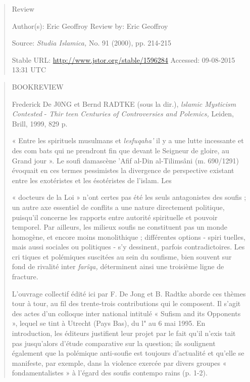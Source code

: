 \begin{quote}
Review

Author(s): Eric Geoffroy Review by: Eric Geoffroy

Source: \emph{Studia Islamica,} No. 91 (2000), pp. 214-215

Stable URL: \url{http://www.jstor.org/stable/1596284} Accessed:
09-08-2015 13:31 UTC
\end{quote}

\begin{quote}
BOOKREVIEW

Frederick De J0NG et Bernd RADTKE (sous la dir.), \emph{lslamic
Mysticism Contested} - \emph{Thir­ teen Centuries of Controversies and
Polemics,} Leiden, Brill, 1999, 829 p.

« Entre les spirituels musulmans et \emph{lesfuqaha'} il y a une lutte
incessante et des com­ bats qui ne prendront fin que devant le Seigneur
de gloire, au Grand jour ». Le soufi damascène 'Afif al-Din al-Tilimsâni
(m. 690/1291) évoquait en ces termes pessimistes la divergence de
perspective existant entre les exotéristes et les ésotéristes de
l'islam. Les

« docteurs de la Loi » n'ont certes pas été les seuls antagonistes des
soufis ; un autre axe essentiel de conflits a une nature directement
politique, puisqu'il concerne les rapports entre autorité spirituelle et
pouvoir temporel. Par ailleurs, les milieux soufis ne constituent pas un
monde homogène, et encore moins monolithique ; différentes options -
spiri­ tuelles, mais aussi sociales ou politiques - s'y dessinent,
parfois contradictoires. Les cri­ tiques et polémiques suscitées au sein
du soufisme, bien souvent sur fond de rivalité inter­ \emph{farîqa,}
déterminent ainsi une troisième ligne de fracture.

L'ouvrage collectif édité ici par F. De Jong et B. Radtke aborde ces
thèmes tour à tour, au fil des trente-trois contributions qui le
composent. Il s'agit des actes d'un colloque inter­ national intitulé «
Sufism and its Opponents », lequel se tint à Utrecht (Pays Bas), du l"
au 6 mai 1995. En introduction, les éditeurs justifient leur projet par
le fait qu'il n'exis­ tait pas jusqu'alors d'étude comparative sur la
question; ils soulignent également que la polémique anti-soufie est
toujours d'actualité et qu'elle se manifeste, par exemple, dans la
violence exercée par divers groupes « fondamentalistes » à l'égard des
soufis contempo­ rains (p. 1-2).


\end{quote}
